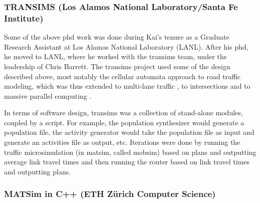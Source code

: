 \subsubsection{TRANSIMS (Los Alamos National Laboratory/Santa Fe Institute)}
\label{sec:history-lanl-phase}
Some of the above \acrshort{phd} work was done during Kai's tenure as a Graduate Research Assistant at Los Alamos National Laboratory (LANL).  After his \acrshort{phd}, he moved to LANL, where he worked with the \gls{transims} \citep[see, e.g.,][]{SmithEtc1995TRANSIMSSeattle} team, under the leadership of Chris Barrett.
%
The \gls{transims} project used some of the design described above, most notably the cellular automata approach to road traffic modeling, which was thus extended to multi-lane traffic \citep{NagelWolfEtAl1998TwoLaneSystematic}, to intersections \citep{NagelEtc1997flow-char} and to massive parallel computing \citep{NagelRickert2001parallel}.


In terms of software design, \gls{transims} was a collection of stand-alone modules, coupled by a script.  For example, the population synthesizer would generate a population file, the activity generator would take the population file as input and generate an activities file as output, etc.  Iterations were done by running 
the traffic \gls{microsimulation} (in \gls{matsim}, called \gls{mobsim})
based on plans and outputting average link travel times and then running the router based on link travel times and outputting plans.

\subsubsection{MATSim in C++ (ETH Zürich Computer Science)}
\label{sec:history-ethz-phase}

